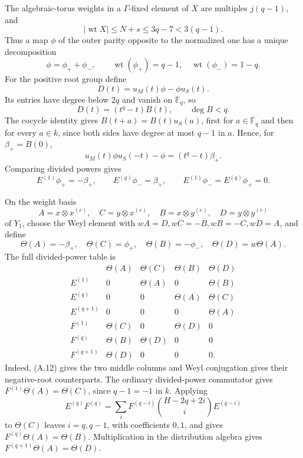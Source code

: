 \documentclass[11pt]{article}
\theoremstyle{definition}
\theoremstyle{remark}
\newcommand{\F}{\mathbb{F}}
\begin{document}
The algebraic-torus weights in a \(\Gamma\)-fixed element of \(X\) are
multiples \(j(q-1)\), and
\[
 |\operatorname{wt}X|\le N+s\le3q-7<3(q-1).
\]
Thus a map \(\phi\) of the outer parity opposite to the normalized one has
a unique decomposition
\[
 \phi=\phi_++\phi_-,\qquad
 \operatorname{wt}(\phi_+)=q-1,\quad
 \operatorname{wt}(\phi_-)=1-q.                        \tag{A.9}
\]
For the positive root group define
\[
 D(t)=u_M(t)\phi-\phi u_S(t).
\]
Its entries have degree below \(2q\) and vanish on \(\F_q\), so
\[
 D(t)=(t^q-t)B(t),\qquad \deg B<q.                      \tag{A.10}
\]
The cocycle identity gives \(B(t+a)=B(t)u_S(a)\), first for
\(a\in\F_q\) and then for every \(a\in k\), since both sides have degree
at most \(q-1\) in \(a\).  Hence, for \(\beta_+=B(0)\),
\[
 u_M(t)\phi u_S(-t)-\phi=(t^q-t)\beta_+.               \tag{A.11}
\]
Comparing divided powers gives
\[
 E^{(1)}\phi_+=-\beta_+,\qquad E^{(q)}\phi_-=\beta_+,
 \qquad E^{(1)}\phi_-=E^{(q)}\phi_+=0.                  \tag{A.12}
\]

On the weight basis
\[
 A=x\otimes x^{(e)},\quad C=y\otimes x^{(e)},\quad
 B=x\otimes y^{(e)},\quad D=y\otimes y^{(e)}
\]
of \(Y_1\), choose the Weyl element with
\(wA=D,wC=-B,wB=-C,wD=A\), and define
\[
 \Theta(A)=-\beta_+,\quad \Theta(C)=\phi_+,\quad
 \Theta(B)=-\phi_-,\quad \Theta(D)=w\Theta(A).          \tag{A.13}
\]
The full divided-power table is
\[
\begin{array}{c|cccc}
 &\Theta(A)&\Theta(C)&\Theta(B)&\Theta(D)\\ \hline
 E^{(1)}&0&\Theta(A)&0&\Theta(B)\\
 E^{(q)}&0&0&\Theta(A)&\Theta(C)\\
 E^{(q+1)}&0&0&0&\Theta(A)\\ \hline
 F^{(1)}&\Theta(C)&0&\Theta(D)&0\\
 F^{(q)}&\Theta(B)&\Theta(D)&0&0\\
 F^{(q+1)}&\Theta(D)&0&0&0 .
\end{array}                                             \tag{A.14}
\]
Indeed, (A.12) gives the two middle columns and Weyl conjugation gives
their negative-root counterparts.  The ordinary divided-power commutator
gives \(F^{(1)}\Theta(A)=\Theta(C)\), since \(q-1=-1\) in \(k\).
Applying
\[
 E^{(q)}F^{(q)}
 =\sum_iF^{(q-i)}
   \binom{H-2q+2i}{i}E^{(q-i)}
\]
to \(\Theta(C)\) leaves \(i=q,q-1\), with coefficients \(0,1\), and
gives \(F^{(q)}\Theta(A)=\Theta(B)\).  Multiplication in the distribution
algebra gives \(F^{(q+1)}\Theta(A)=\Theta(D)\).
\end{document}
